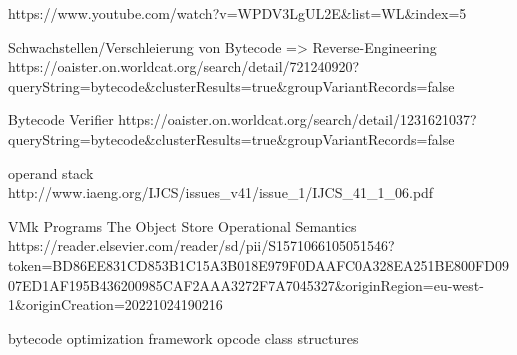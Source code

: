 https://www.youtube.com/watch?v=WPDV3LgUL2E&list=WL&index=5

Schwachstellen/Verschleierung von Bytecode => Reverse-Engineering
https://oaister.on.worldcat.org/search/detail/721240920?queryString=bytecode&clusterResults=true&groupVariantRecords=false

Bytecode Verifier
https://oaister.on.worldcat.org/search/detail/1231621037?queryString=bytecode&clusterResults=true&groupVariantRecords=false

operand stack
http://www.iaeng.org/IJCS/issues_v41/issue_1/IJCS_41_1_06.pdf

VMk Programs
The Object Store
Operational Semantics
https://reader.elsevier.com/reader/sd/pii/S1571066105051546?token=BD86EE831CD853B1C15A3B018E979F0DAAFC0A328EA251BE800FD0907ED1AF195B436200985CAF2AAA3272F7A7045327&originRegion=eu-west-1&originCreation=20221024190216

bytecode optimization framework
opcode
class structures